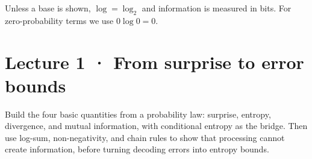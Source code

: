 Unless a base is shown, $\log=\log_2$ and information is measured in bits.
For zero-probability terms we use $0\log 0=0$.

\clearpage
{\small\tableofcontents}

\clearpage
\section*{Lecture 1 · From surprise to error bounds}
{}
\begin{strand}
Build the four basic quantities from a probability law: surprise, entropy,
divergence, and mutual information, with conditional entropy as the bridge.
Then use log-sum, non-negativity, and chain rules to show that processing
cannot create information, before turning decoding errors into entropy bounds.
\end{strand}






\clearpage







